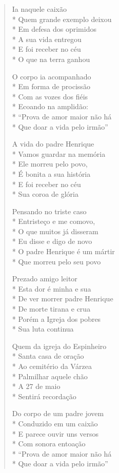 \begin{verse}
Ia naquele caixão\\*
Quem grande exemplo deixou\\*
Em defesa dos oprimidos\\*
A sua vida entregou\\*
E foi receber no céu\\*
O que na terra ganhou

O corpo ia acompanhado\\*
Em forma de procissão\\*
Com as vozes dos fiéis\\*
Ecoando na amplidão:\\*
“Prova de amor maior não há\\*
Que doar a vida pelo irmão”

A vida do padre Henrique\\*
Vamos guardar na memória\\*
Ele morreu pelo povo,\\*
É bonita a sua história\\*
E foi receber no céu\\*
Sua coroa de glória

Pensando no triste caso\\*
Entristeço e me comovo,\\*
O que muitos já disseram\\*
Eu disse e digo de novo\\*
O padre Henrique é um mártir\\*
Que morreu pelo seu povo

Prezado amigo leitor\\*
Esta dor é minha e sua\\*
De ver morrer padre Henrique\\*
De morte tirana e crua\\*
Porém a Igreja dos pobres\\*
Sua luta continua

Quem da igreja do Espinheiro\\*
Santa casa de oração\\*
Ao cemitério da Várzea\\*
Palmilhar aquele chão\\*
A 27 de maio\\*
Sentirá recordação

Do corpo de um padre jovem\\*
Conduzido em um caixão\\*
E parece ouvir uns versos\\*
Com sonora entoação\\*
“Prova de amor maior não há\\*
Que doar a vida pelo irmão”

\end{verse}

